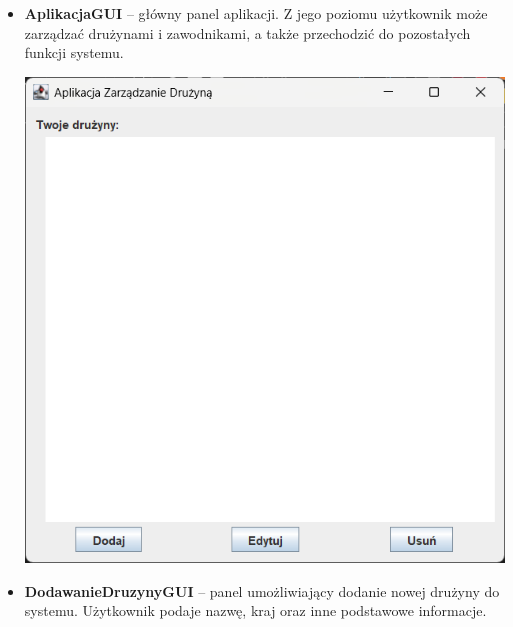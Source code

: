 \documentclass{urdpl}     %
\begin{document}
\begin{itemize}
  \item
  \begin{minipage}[t]{\linewidth}
    \textbf{AplikacjaGUI} -- główny panel aplikacji. Z jego poziomu użytkownik może zarządzać drużynami i zawodnikami, a także przechodzić do pozostałych funkcji systemu.

    \vspace{0.3em}
    \begin{center}
      \includegraphics[width=0.75\linewidth]{panelaplikacji.png}
      \label{fig:aplikacja}
    \end{center}
  \end{minipage}

  \item
  \begin{minipage}[t]{\linewidth}
    \textbf{DodawanieDruzynyGUI} -- panel umożliwiający dodanie nowej drużyny do systemu. Użytkownik podaje nazwę, kraj oraz inne podstawowe informacje.


\end{minipage}
\end{itemize}
\end{document}
